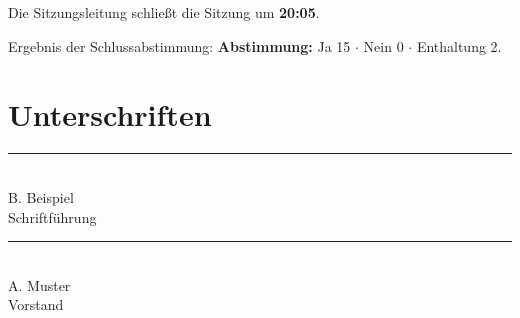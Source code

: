 \documentclass{scrbook}\PassOptionsToPackage{hyperfootnotes=false}{hyperref}\usepackage{amsmath}\usepackage{array}\usepackage[ngerman]{babel}\usepackage{biblatex}\usepackage{booktabs}\usepackage{calc}\usepackage{hyperref}\usepackage{cleveref}\usepackage{csquotes}\usepackage{etoolbox}\usepackage{eurosym}\usepackage{fontawesome}\usepackage{fontspec}\usepackage{geometry}\usepackage[acronym]{glossaries}\usepackage{graphicx}\usepackage{listings}\usepackage{lmodern}\usepackage{longtable}\usepackage[framemethod=tikz]{mdframed}\usepackage{multicol}\usepackage{needspace}\usepackage{pgf}\usepackage{pgffor}\usepackage{ragged2e}\usepackage{scrlayer-scrpage}\usepackage{setspace}\usepackage{tabularx}\usepackage{tikz}\usepackage{xcolor}\KOMAoptions{open=any,twoside=false}\geometry{a4paper=,top=2cm,bottom=2cm,left=2cm,right=2cm}\definecolor{britishracinggreen}{rgb}{0.0,0.26,0.15}\definecolor{eggplant}{rgb}{0.38,0.25,0.32}\definecolor{hanblue}{rgb}{0.27,0.42,0.81}\definecolor{navyblue}{rgb}{0.0,0.0,0.5}\definecolor{pansypurple}{rgb}{0.47,0.09,0.29}\definecolor{shockingpink}{rgb}{0.99,0.06,0.75}\definecolor{lightgray}{rgb}{0.8,0.8,0.8}\definecolor{hsrtcite}{rgb}{0.286,0.427,0.537}\definecolor{hsrtlink}{rgb}{0.161,0.31,0.427}\definecolor{hsrturl}{rgb}{0.071,0.212,0.322}\hypersetup{pdfpagemode=UseOutlines,bookmarksopen=true,bookmarksopenlevel=0,plainpages=false,hypertexnames=true,colorlinks=true,citecolor=hsrtcite,linkcolor=hsrtlink,urlcolor=hsrturl,pdfstartview=FitV,unicode=true,breaklinks=true}\crefname{figure}{Abbildung}{Abbildungen}\Crefname{figure}{Abbildung}{Abbildungen}\crefname{table}{Tabelle}{Tabellen}\Crefname{table}{Tabelle}{Tabellen}\crefname{equation}{Gleichung}{Gleichungen}\Crefname{equation}{Gleichung}{Gleichungen}\crefname{chapter}{Kapitel}{Kapitel}\Crefname{chapter}{Kapitel}{Kapitel}\crefname{section}{Abschnitt}{Abschnitte}\Crefname{section}{Abschnitt}{Abschnitte}\crefname{subsection}{Unterabschnitt}{Unterabschnitte}\Crefname{subsection}{Unterabschnitt}{Unterabschnitte}\crefname{subsubsection}{Unterunterabschnitt}{Unterunterabschnitte}\Crefname{subsubsection}{Unterunterabschnitt}{Unterunterabschnitte}\crefname{listing}{Listing}{Codeblock}\Crefname{listing}{Listing}{Codeblock}\crefname{appendix}{Anhang}{Anhänge}\Crefname{appendix}{Anhang}{Anhänge}\crefname{algorithm}{Algorithmus}{Algorithmen}\Crefname{algorithm}{Algorithmus}{Algorithmen}\crefname{theorem}{Theorem}{Theoreme}\Crefname{theorem}{Theorem}{Theoreme}\crefname{lemma}{Lemma}{Lemmata}\Crefname{lemma}{Lemma}{Lemmata}\crefname{corollary}{Korollar}{Korollare}\Crefname{corollary}{Korollar}{Korollare}\crefname{proposition}{Proposition}{Propositionen}\Crefname{proposition}{Proposition}{Propositionen}\crefname{definition}{Definition}{Definitionen}\Crefname{definition}{Definition}{Definitionen}\crefname{example}{Beispiel}{Beispiele}\Crefname{example}{Beispiel}{Beispiele}\crefname{remark}{Bemerkung}{Bemerkungen}\Crefname{remark}{Bemerkung}{Bemerkungen}\crefname{footnote}{Fußnote}{Fußnoten}\Crefname{footnote}{Fußnote}{Fußnoten}\crefname{enumi}{Punkt}{Punkte}\Crefname{enumi}{Punkt}{Punkte}\crefname{enumii}{Punkt}{Punkte}\Crefname{enumii}{Punkt}{Punkte}\crefname{enumiii}{Punkt}{Punkte}\Crefname{enumiii}{Punkt}{Punkte}\crefname{enumiv}{Punkt}{Punkte}\Crefname{enumiv}{Punkt}{Punkte}\crefname{page}{Seite}{Seiten}\Crefname{page}{Seite}{Seiten}\crefname{line}{Zeile}{Zeilen}\Crefname{line}{Zeile}{Zeilen}\lstset{basicstyle=\footnotesize\ttfamily,breaklines=true,numbers=left,frame=single,float=H}\lstdefinestyle{htmlCode}{language=html,basicstyle=\scriptsize\ttfamily,keywordstyle=\color{blue}\bfseries\ttfamily,commentstyle=\color{gray}\ttfamily,escapechar=|}\lstdefinestyle{phpCode}{language=php,morekeywords={php},basicstyle=\footnotesize\ttfamily,keywordstyle=\color{blue}\bfseries\ttfamily,commentstyle=\color{gray}\ttfamily,escapechar=|}\lstdefinestyle{jsCode}{language=javascript,basicstyle=\scriptsize\ttfamily,keywordstyle=\color{blue}\bfseries\ttfamily,commentstyle=\color{gray}\ttfamily,escapechar=|}\lstdefinestyle{shellCodeNOPASSWD}{language=sh,deletekeywords={for,kill,cat},morekeywords={sudo},basicstyle=\scriptsize\ttfamily,keywordstyle=\color{blue}\bfseries\ttfamily,commentstyle=\color{gray}\ttfamily,escapechar=|,numbers=none}\lstdefinestyle{shellCode}{language=sh,morekeywords={sudo,chmod,chown,cp,su,rm,python},basicstyle=\scriptsize\ttfamily,keywordstyle=\color{blue}\bfseries\ttfamily,commentstyle=\color{gray}\ttfamily,escapechar=|}\lstdefinestyle{URL}{basicstyle=\footnotesize\ttfamily,commentstyle=\color{gray}\ttfamily,escapechar=|,numbers=none}\newcommand{\acr}{\acrshort}\usepackage{lastpage}
\begin{document}
Die Sitzungsleitung schließt die Sitzung um \textcolor{hanblue}{ \textbf{20:05}}.

Ergebnis der Schlussabstimmung: \textbf{Abstimmung: }\textcolor{britishracinggreen}{Ja 15 $\cdot$ Nein 0 $\cdot$ Enthaltung 2}.

\par\vspace{2em}\section*{Unterschriften}\par\vspace{3em}\noindent \begin{minipage}[t]{0.46\linewidth}\centering\rule{5cm}{0.4pt}\\[0.4em]B. Beispiel\\{\small Schriftführung}\end{minipage}\hfill\begin{minipage}[t]{0.46\linewidth}\centering\rule{5cm}{0.4pt}\\[0.4em]A. Muster\\{\small Vorstand}\end{minipage}
\end{document}
